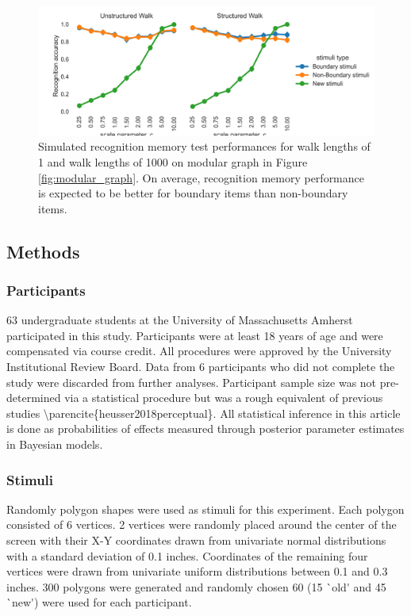 \begin{figure}[ht]
    \centering
    \includegraphics[width = \textwidth]{chapter_notebooks/chapter_3/figures/recog_memory_with_c.png}
    \caption{Simulated recognition memory test performances for walk lengths of 1 and walk lengths of 1000 on modular graph in Figure \ref{fig:modular_graph}. On average, recognition memory performance is expected to be better for boundary items than non-boundary items.}
    \label{fig:recog_memory_sims_with_c}
\end{figure}



\subsection{Methods}
\subsubsection*{Participants}
63 undergraduate students at the University of Massachusetts Amherst participated in this study. Participants were at least 18 years of age and were compensated via course credit. All procedures were approved by the University Institutional Review Board. \ac{Data from 6 participants who did not complete the study were discarded from further analyses. Participant sample size was not pre-determined via a statistical procedure but was a rough equivalent of previous studies \parencite{heusser2018perceptual}. All statistical inference in this article is done as probabilities of effects measured through posterior parameter estimates in Bayesian models.}

\subsubsection*{Stimuli}
\ac{Randomly polygon shapes were used as stimuli for this experiment. Each polygon consisted of 6 vertices. 2 vertices were randomly placed around the center of the screen with their X-Y coordinates drawn from univariate normal distributions with a standard deviation of 0.1 inches. Coordinates of the remaining four vertices were drawn from univariate uniform distributions between 0.1 and 0.3 inches. 300 polygons were generated and randomly chosen 60 (15 `old' and 45 `new') were used for each participant.}

